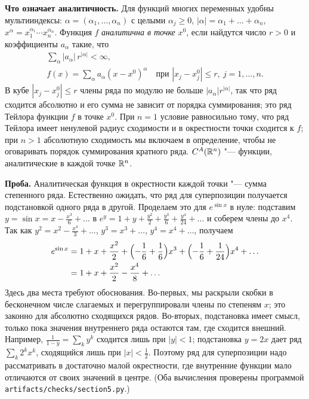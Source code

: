 \begin{solution}[2 (\S\,5)]
\textbf{Что означает аналитичность.} Для функций многих переменных удобны
мультииндексы: $\alpha=(\alpha_1,\dots,\alpha_n)$ с целыми
$\alpha_j\ge0$, $|\alpha|=\alpha_1+\dots+\alpha_n$,
$x^\alpha=x_1^{\alpha_1}\cdots x_n^{\alpha_n}$. Функция $f$
\emph{аналитична в точке} $x^0$, если найдутся число $r>0$ и коэффициенты
$a_\alpha$ такие, что
\begin{gather*}
\sum_\alpha|a_\alpha|\,r^{|\alpha|}<\infty,\\
f(x)=\sum_\alpha a_\alpha(x-x^0)^\alpha\quad\text{при }|x_j-x^0_j|\le r,\ j=1,\dots,n .
\end{gather*}
В кубе $|x_j-x^0_j|\le r$ члены ряда по модулю не больше $|a_\alpha|r^{|\alpha|}$,
так что ряд сходится абсолютно и его сумма не зависит от порядка
суммирования; это ряд Тейлора функции $f$ в точке $x^0$. При $n=1$ условие
равносильно тому, что ряд Тейлора имеет ненулевой радиус сходимости
и в окрестности точки сходится к $f$; при $n>1$ абсолютную сходимость мы
включаем в определение, чтобы не оговаривать порядок суммирования кратного
ряда. $C^A(\mathbb R^n)$ "--- функции, аналитические в каждой точке $\mathbb R^n$.

\textbf{Проба.} Аналитическая функция в окрестности каждой точки "--- сумма
степенного ряда. Естественно ожидать, что ряд для суперпозиции получается
подстановкой одного ряда в другой. Проделаем это для $e^{\sin x}$ в нуле:
подставим $y=\sin x=x-\frac{x^3}{6}+\dots$ в
$e^y=1+y+\frac{y^2}{2}+\frac{y^3}{6}+\frac{y^4}{24}+\dots$ и соберем
члены до $x^4$. Так как $y^2=x^2-\frac{x^4}{3}+\dots$, $y^3=x^3+\dots$,
$y^4=x^4+\dots$, получаем
\begin{align*}
e^{\sin x}&=1+x+\frac{x^2}{2}+\Bigl(-\frac16+\frac16\Bigr)x^3
+\Bigl(-\frac16+\frac1{24}\Bigr)x^4+\dots\\
&=1+x+\frac{x^2}{2}-\frac{x^4}{8}+\dots
\end{align*}
Здесь два места требуют обоснования. Во-первых, мы раскрыли скобки
в бесконечном числе слагаемых и перегруппировали члены по степеням $x$;
это законно для абсолютно сходящихся рядов. Во-вторых, подстановка имеет
смысл, только пока значения внутреннего ряда остаются там, где сходится
внешний. Например, $\frac1{1-y}=\sum_ky^k$ сходится лишь при $|y|<1$;
подстановка $y=2x$ дает ряд $\sum_k2^kx^k$, сходящийся лишь при
$|x|<\frac12$. Поэтому ряд для суперпозиции надо рассматривать в
достаточно малой окрестности, где внутренние функции мало отличаются от
своих значений в центре. (Оба вычисления проверены программой
\texttt{artifacts/checks/section5.py}.)


\end{solution}

